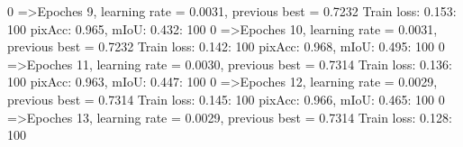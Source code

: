   0%
=>Epoches 9, learning rate = 0.0031,                 previous best = 0.7232
Train loss: 0.153: 100%
pixAcc: 0.965, mIoU: 0.432: 100%
  0%
=>Epoches 10, learning rate = 0.0031,                 previous best = 0.7232
Train loss: 0.142: 100%
pixAcc: 0.968, mIoU: 0.495: 100%
  0%
=>Epoches 11, learning rate = 0.0030,                 previous best = 0.7314
Train loss: 0.136: 100%
pixAcc: 0.963, mIoU: 0.447: 100%
  0%
=>Epoches 12, learning rate = 0.0029,                 previous best = 0.7314
Train loss: 0.145: 100%
pixAcc: 0.966, mIoU: 0.465: 100%
  0%
=>Epoches 13, learning rate = 0.0029,                 previous best = 0.7314
Train loss: 0.128: 100%
